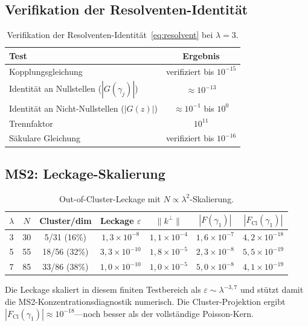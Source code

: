 \documentclass[12pt,a4paper]{article}
\theoremstyle{definition}
\theoremstyle{remark}
\newcommand{\Cl}{\mathrm{Cl}}
\newcommand{\norm}[1]{\| #1 \|}
\begin{document}
\subsection{Verifikation der Resolventen-Identität}

\begin{table}[h]
\centering
\caption{Verifikation der Resolventen-Identität~\eqref{eq:resolvent} bei $\lambda = 3$.}
\label{tab:resolvent}
\begin{tabular}{lc}
\toprule
Test & Ergebnis \\
\midrule
Kopplungsgleichung & verifiziert bis $10^{-15}$ \\
Identität an Nullstellen ($|G(\gamma_j)|$) & $\approx 10^{-13}$ \\
Identität an Nicht-Nullstellen ($|G(z)|$) & $\approx 10^{-1}$ bis $10^{0}$ \\
Trennfaktor & $10^{11}$ \\
Säkulare Gleichung & verifiziert bis $10^{-16}$ \\
\bottomrule
\end{tabular}
\end{table}

\subsection{MS2: Leckage-Skalierung}

\begin{table}[h]
\centering
\caption{Out-of-Cluster-Leckage mit $N \propto \lambda^2$-Skalierung.}
\label{tab:leakage}
\begin{tabular}{ccccccc}
\toprule
$\lambda$ & $N$ & Cluster/dim & Leckage $\varepsilon$ &
  $\norm{k^\perp}$ & $|F({\gamma_1})|$ & $|F_{\Cl}(\gamma_1)|$ \\
\midrule
3 & 30 & 5/31 (16\%) & $1{,}3 \times 10^{-8}$ & $1{,}1 \times 10^{-4}$ &
  $1{,}6 \times 10^{-7}$ & $4{,}2 \times 10^{-18}$ \\
5 & 55 & 18/56 (32\%) & $3{,}3 \times 10^{-10}$ & $1{,}8 \times 10^{-5}$ &
  $2{,}3 \times 10^{-8}$ & $5{,}5 \times 10^{-19}$ \\
7 & 85 & 33/86 (38\%) & $1{,}0 \times 10^{-10}$ & $1{,}0 \times 10^{-5}$ &
  $5{,}0 \times 10^{-8}$ & $4{,}1 \times 10^{-19}$ \\
\bottomrule
\end{tabular}
\end{table}

Die Leckage skaliert in diesem finiten Testbereich als
$\varepsilon \sim \lambda^{-3,7}$ und stützt damit die
MS2-Konzentrationsdiagnostik numerisch.
Die Cluster-Projektion ergibt $|F_{\Cl}(\gamma_1)| \approx 10^{-18}$---noch
besser als der vollständige Poisson-Kern.
\end{document}
